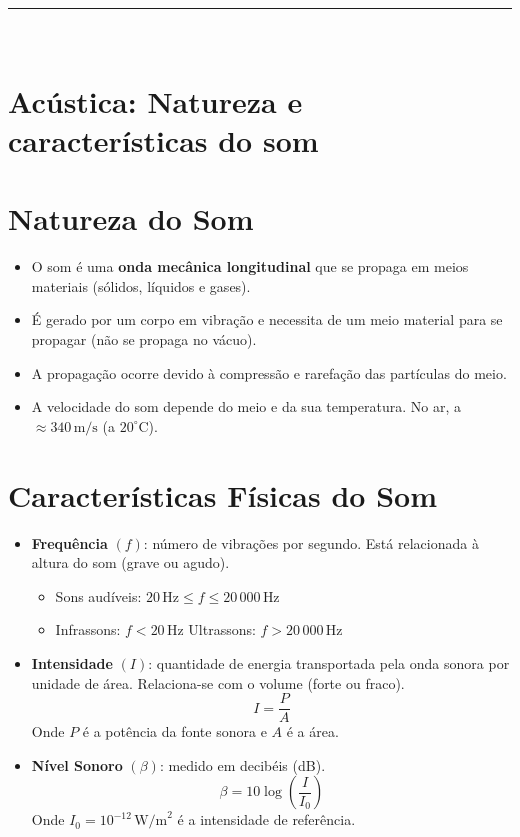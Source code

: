 \documentclass[a4paper,12pt]{article}
\begin{document}
\begin{multicols}{2}
\noindent\rule{\linewidth}{1pt}\\

\section{Acústica: Natureza e características do som}

\section{Natureza do Som}
\begin{itemize}
    \item O som é uma \textbf{onda mecânica longitudinal} que se propaga em meios materiais (sólidos, líquidos e gases).
    \item É gerado por um corpo em vibração e necessita de um meio material para se propagar (não se propaga no vácuo).
    \item A propagação ocorre devido à compressão e rarefação das partículas do meio.
    \item A velocidade do som depende do meio e da sua temperatura. No ar, a $\approx 340\,\text{m/s}$ (a $20^\circ$C).
\end{itemize}

\section{Características Físicas do Som}
\begin{itemize}
    \item \textbf{Frequência} $(f)$: número de vibrações por segundo. Está relacionada à altura do som (grave ou agudo).
    \begin{itemize}
        \item Sons audíveis: $20\,\text{Hz} \leq f \leq 20\,000\,\text{Hz}$
        \item Infrassons: $f < 20\,\text{Hz}$ \quad Ultrassons: $f > 20\,000\,\text{Hz}$
    \end{itemize}
    
    \item \textbf{Intensidade} $(I)$: quantidade de energia transportada pela onda sonora por unidade de área. Relaciona-se com o volume (forte ou fraco).
    \[
        I = \frac{P}{A}
    \]
    Onde $P$ é a potência da fonte sonora e $A$ é a área.
    
    \item \textbf{Nível Sonoro} $(\beta)$: medido em decibéis (dB).
    \[
        \beta = 10 \log \left( \frac{I}{I_0} \right)
    \]
    Onde $I_0 = 10^{-12}\,\text{W/m}^2$ é a intensidade de referência.
    

\end{itemize}
\end{multicols}
\end{document}
